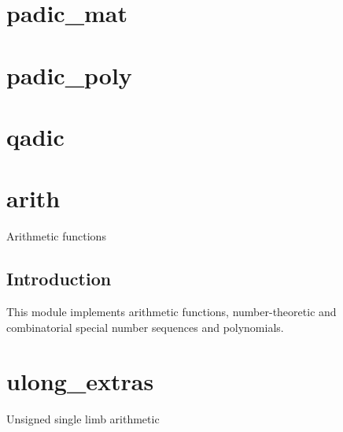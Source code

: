 \documentclass[a4paper,10pt]{book}
\begin{document}
{{\chapter{padic\_mat}



\chapter{padic\_poly}



\chapter{qadic}



\chapter{arith}
\epigraph{Arithmetic functions}{}

\section{Introduction}

This module implements arithmetic functions, number-theoretic and
combinatorial special number sequences and polynomials.




\chapter{ulong\_extras}
\epigraph{Unsigned single limb arithmetic}{}

}}
\end{document}
